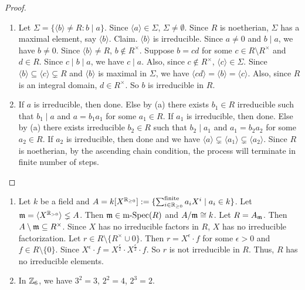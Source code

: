 \begin{proof}
    \begin{enumerate}
        \item Let $\Sigma = \{\langle b \rangle \neq R : b \mid a\}$. Since $\langle a \rangle \in \Sigma$, $\Sigma \neq \emptyset$. Since $R$ is noetherian, $\Sigma$ has a maximal element, say $\langle b \rangle$. Claim. $\langle b \rangle$ is irreducible. Since $a \neq 0$ and $b \mid a$, we have $b \neq 0$. Since $\langle b \rangle \neq R$, $b \not \in R^{\times}$. Suppose $b = cd$ for some $c \in R \setminus R^{\times}$ and $d \in R$. Since $c \mid b \mid a$, we have $c \mid a$. Also, since $c \not \in R^{\times}$, $\langle c \rangle \in \Sigma$. Since $\langle b \rangle \subseteq \langle c \rangle \subsetneq R$ and $\langle b \rangle$ is maximal in $\Sigma$, we have $\langle cd \rangle = \langle b \rangle = \langle c \rangle$. Also, since $R$ is an integral domain, $d \in R^{\times}$. So $b$ is irreducible in $R$.
        \item If $a$ is irreducible, then done. Else by (a) there exists $b_1 \in R$ irreducible such that $b_1 \mid a$ and $a = b_1a_1$ for some $a_1 \in R$. If $a_1$ is irreducible, then done. Else by (a) there exists irreducible $b_2 \in R$ such that $b_2 \mid a_1$ and $a_1 = b_2a_2$ for some $a_2 \in R$. If $a_2$ is irreducible, then done and we have $\langle a \rangle \subsetneq \langle a_1 \rangle \subsetneq \langle a_2 \rangle$. Since $R$ is noetherian, by the ascending chain condition, the process will terminate in finite number of steps. \qedhere
    \end{enumerate}
\end{proof}

\begin{example}
    \begin{enumerate}
        \item 
            Let $k$ be a field and $A = k[X^{\mathbb{R}_{\geq 0}}] := \{\sum_{i \in \mathbb{R}_{\geq 0}}^{\text{finite}}a_iX^{i} \mid a_i \in k\}$. Let $\mathfrak{m} = \langle X^{\mathbb{R}_{>0}} \rangle \lneq A$. Then $\mathfrak{m} \in \operatorname{m-Spec}(R)$ and $A/\mathfrak{m} \cong k$. Let $R = A_{\mathfrak{m}}$. Then $A \setminus \mathfrak{m} \subseteq R^{\times}$. Since $X$ has no irreducible factors in $R$, $X$ has no irreducible factorization. Let $r \in R \setminus \{R^{\times} \cup 0\}$. Then $r = X^{\epsilon} \cdot f$ for some $\epsilon > 0$ and $f \in R \setminus \{0\}$. Since $X^{\epsilon} \cdot f = X^{\frac{\epsilon}{2}} \cdot X^{\frac{\epsilon}{2}} \cdot f$. So $r$ is not irreducible in $R$. Thus, $R$ has no irreducible elements.
        \item 
            In $\mathbb{Z}_6$, we have $3^{2} = 3$, $2^{2} = 4$, $2^{3} = 2$.
    \end{enumerate}
\end{example}

